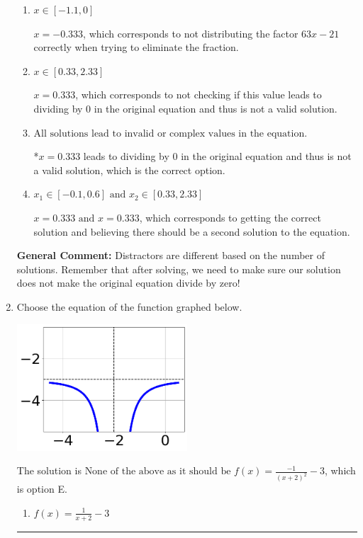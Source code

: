 \documentclass{extbook}[14pt]
\newcommand{\litem}[1]{\item #1

\rule{\textwidth}{0.4pt}}
\begin{document}
\begin{enumerate}
{\begin{enumerate}[label=\Alph*.]
$x = -0.333 \text{ and } x = 0.333$, which corresponds to getting the correct solution and believing there should be a second solution to the equation.
\item \( x \in [-1.1,0] \)

$x = -0.333$, which corresponds to not distributing the factor $63x -21$ correctly when trying to eliminate the fraction.
\item \( x \in [0.33,2.33] \)

$x = 0.333$, which corresponds to not checking if this value leads to dividing by 0 in the original equation and thus is not a valid solution.
\item \( \text{All solutions lead to invalid or complex values in the equation.} \)

*$x = 0.333$ leads to dividing by 0 in the original equation and thus is not a valid solution, which is the correct option.
\item \( x_1 \in [-0.1, 0.6] \text{ and } x_2 \in [0.33,2.33] \)

$x = 0.333 \text{ and } x = 0.333$, which corresponds to getting the correct solution and believing there should be a second solution to the equation.
\end{enumerate}

\textbf{General Comment:} Distractors are different based on the number of solutions. Remember that after solving, we need to make sure our solution does not make the original equation divide by zero!
}
\litem{
Choose the equation of the function graphed below.

\begin{center}
    \includegraphics[width=0.5\textwidth]{../Figures/rationalGraphToEquationCopyC.png}
\end{center}


The solution is \( \text{None of the above as it should be } f(x) = \frac{-1}{(x + 2)^2} - 3 \), which is option E.\begin{enumerate}[label=\Alph*.]
\item \( f(x) = \frac{1}{x + 2} - 3 \)


\end{enumerate}}
\end{enumerate}
\end{document}

